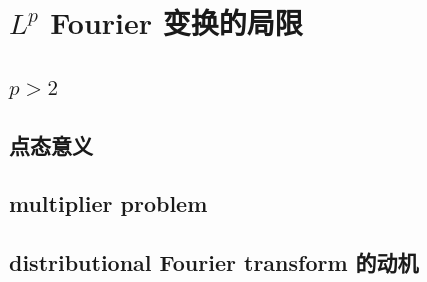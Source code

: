 \section{\texorpdfstring{\(L^p\)}{Lᵖ} Fourier 变换的局限}
\label{b2:sec:0403}


\subsection{\texorpdfstring{\(p>2\)}{p>2}}
\label{b2:subsec:040301}

\subsection{点态意义}
\label{b2:subsec:040302}

\subsection{multiplier problem}
\label{b2:subsec:040303}

\subsection{distributional Fourier transform 的动机}
\label{b2:subsec:040304}


